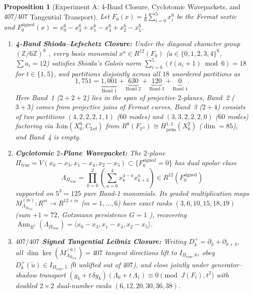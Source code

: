 \documentclass[11pt,a4paper]{amsart}
\newtheorem{proposition}[theorem]{Proposition}
\theoremstyle{definition}
\theoremstyle{remark}
\DeclareMathOperator{\Ann}{Ann}
\begin{document}
\begin{proposition}[Experiment A: 4-Band Closure, Cyclotomic Wavepackets, and $407/407$ Tangential Transport]
\label{thm:A}
Let $F_0(x) = \frac{1}{6}\sum_{i=0}^5 x_i^6$ be the Fermat sextic and $F_0^{\mathrm{signed}}(x) = x_0^6 - x_3^6 + x_1^6 - x_4^6 + x_2^6 - x_5^6$.
\begin{enumerate}[label=(\roman*)]
\item \textbf{4-Band Shioda--Lefschetz Closure:} Under the diagonal character group $(\mathbb{Z}/6\mathbb{Z})^6$ \cite{Shioda1979}, every basis monomial $x^a \in R^{12}(F_0)$ ($a \in \{0,1,2,3,4\}^6$, $\sum a_i = 12$) satisfies Shioda's Galois norm $\sum_{i=0}^5 (t(a_i+1) \bmod 6) = 18$ for $t \in \{1,5\}$, and partitions disjointly across all $18$ unordered partitions as
\[
1,751 = \underbrace{1,001}_{\text{Band 1}} + \underbrace{630}_{\text{Band 2}} + \underbrace{120}_{\text{Band 3}} + \underbrace{0}_{\text{Band 4}}.
\]
Here Band~1 ($2+2+2$) lies in the span of projective $2$-planes, Band~2 ($3+3$) comes from projective joins of Fermat curves, Band~3 ($2+4$) consists of two partitions $(4,2,2,2,1,1)$ ($60$ modes) and $(3,3,2,2,2,0)$ ($60$ modes) factoring via $\mathrm{Join}(X^0_6, C_{\mathrm{Lef}})$ from $R^8(F_{\mathbb{P}^3}) \cong H^{1,1}_{\mathrm{prim}}(X^2_6)$ ($\dim = 85$), and Band~4 is empty.
\item \textbf{Cyclotomic $2$-Plane Wavepacket:} The $2$-plane $\Pi_{\mathrm{true}} = V(x_0-x_3, x_1-x_4, x_2-x_5) \subset \{F_0^{\mathrm{signed}}=0\}$ has dual apolar class
\[
\Lambda_{\Pi_{\mathrm{true}}} = \prod_{k=0}^{2} \left(\sum_{a=0}^{4} x_k^{4-a} x_{k+3}^a\right) \in R^{12}(F_0^{\mathrm{signed}})
\]
supported on $5^3 = 125$ pure Band-1 monomials. Its graded multiplication maps $M^{(m)}_{\Lambda_{\Pi_{\mathrm{true}}}} : R^m \to R^{12+m}$ ($m = 1, \dots, 6$) have exact ranks $(3, 6, 10, 15, 18, 19)$ (sum $+ 1 = 72$, Gotzmann persistence $G=1$ \cite{Gotzmann1978}), recovering $\Ann_{R^1}(\Lambda_{\Pi_{\mathrm{true}}}) = \langle x_0-x_3, x_1-x_4, x_2-x_5 \rangle$.
\item \textbf{$407/407$ Signed Tangential Leibniz Closure:} Writing $D_k^+ = \partial_k + \partial_{k+3}$, all $\dim \ker(M^{(6)}_{\Lambda_{\Pi_{\mathrm{true}}}}) = 407$ tangent directions lift to $I_{\Pi_{\mathrm{true}},6}$, obey $D_k^+(\tilde{u}) \in I_{\Pi_{\mathrm{true}},5}$ ($0$ unlifted out of $407$), and close jointly under generator--shadow transport $(g_k + t\,\delta g_k)(\Lambda_0 + t\,\Lambda_1) \equiv 0 \pmod{J(F_t), t^2}$ with doubled $2 \times 2$ dual-number ranks $(6, 12, 20, 30, 36, 38)$.
\end{enumerate}
\end{proposition}
\end{document}
